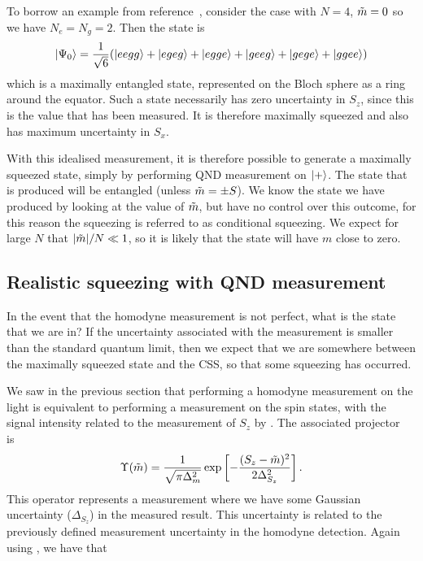 To borrow an example from reference~\cite{Cox2016}, consider the case with
$N=4$, $\tilde{m}=0$ so we have $N_e = N_g = 2$. Then the state is
%
\begin{equation}
  \ket{\Psi_0} = \frac{1}{\sqrt{6}}(\ket{eegg} + \ket{egeg} + \ket{egge} +
  \ket{geeg} + \ket{gege} + \ket{ggee})
\end{equation}
%
which is a maximally entangled state, represented on the Bloch sphere as a ring
around the equator.
%
Such a state necessarily has zero uncertainty in $S_z$, since this is the value
that has been measured. It is therefore maximally squeezed and also has maximum
uncertainty in $S_x$.

With this idealised measurement, it is therefore possible to generate a maximally
squeezed state, simply by performing QND measurement on $\ket{+}$. The state
that is produced will be entangled (unless $\tilde{m} = \pm S$). We know the
state we have produced by looking at the value of $\tilde{m}$, but have no
control over this outcome, for this reason the squeezing is referred to as
conditional squeezing.
%
We expect for large $N$ that $|\tilde{m}|/N \ll 1$, so it is likely that the
state will have $m$ close to zero.

\subsection{Realistic squeezing with QND measurement}

In the event that the homodyne measurement is not perfect, what is the state
that we are in? If the uncertainty associated with the measurement is smaller
than the standard quantum limit, then we expect that we are somewhere between
the maximally squeezed state and the CSS, so that some squeezing has
occurred.

We saw in the previous section that performing a homodyne measurement on the
light is equivalent to performing a measurement on the spin states, with the
signal intensity related to the measurement of $S_z$ by .
The associated projector is~\cite{MAURODARIANO2003205, Vanner16182, Cox2016}
%
\begin{equation}
  \Upsilon(\tilde{m}) = \frac{1}{\sqrt{\pi\Delta_m^2}}\exp\left[
    -\frac{(S_z-\tilde{m})^2}{2\Delta_{S_z}^2}\right].
\end{equation}
%
This operator represents a measurement where we have some Gaussian uncertainty
($\Delta_{S_z}$) in the measured result. This uncertainty is related to the
previously defined measurement uncertainty in the homodyne detection. Again
using , we have that
%


